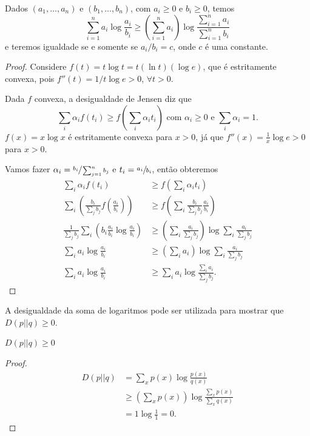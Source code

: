 \begin{proposition}
Dados $(a_1, \ldots, a_n)$ e $(b_1,\ldots,b_n)$, com $a_i \geq 0$ e $b_i \geq 0$, temos
\begin{equation}\label{eq:dessomalog}
\sum_{i=1}^n a_i \log \frac{a_i}{b_i} \geq \left( \sum_{i=1}^n a_i \right) \log \frac{\sum_{i=1}^n a_i}{\sum_{i=1}^n b_i}
\end{equation}
e teremos igualdade se e somente se $a_i/b_i = c$, onde $c$ é uma constante.
\end{proposition}
\begin{proof}
Considere $f(t) = t \log t = t (\ln t) (\log e)$, que é estritamente convexa, pois
$f''(t) = 1/t \log e >0$, $\forall t > 0$.

Dada $f$ convexa, a desigualdade de Jensen diz que
\begin{equation}
\sum_i \alpha_i f(t_i) \geq f \left( \sum_i \alpha_i t_i \right) \text{ com } \alpha_i \geq 0 \text{ e } \sum_i \alpha_i = 1.
\end{equation}
$f(x) = x \log x$ é estritamente convexa para $x>0$, já que $f''(x)=\frac{1}{x} \log e > 0$ para $x>0$.

Vamos fazer $\alpha_i = \sfrac{b_i}{\sum_{j=1}^n b_j}$ e $t_i = \sfrac{a_i}{b_i}$, então obteremos
\begin{subequations}
    \begin{align}
	\sum_i \alpha_i f(t_i) &\geq f \left( \sum_i \alpha_i t_i \right) \\
	\sum_i \left( \frac{b_i}{\sum_j b_j} f \left( \frac{a_i}{b_i} \right) \right) &\geq f \left( \sum_i \frac{b_i}{\sum_j b_j} \frac{a_i}{b_i} \right) \\
	\frac{1}{\sum_j b_j} \sum_i \left( b_i \frac{a_i}{b_i} \log \frac{a_i}{b_i} \right) &\geq \left( \sum_i \frac{a_i}{\sum_j b_j} \right) \log \sum_i \frac{a_i}{\sum_j b_j} \\
	\sum_i a_i \log \frac{a_i}{b_i} &\geq \left( \sum_i a_i \right) \log \sum_i \frac{a_i}{\sum_j b_j} \\
	\sum_i a_i \log \frac{a_i}{b_i} &\geq \sum_i a_i \log \frac{\sum_i a_i}{\sum_j b_j} .
    \end{align}
\end{subequations}
\end{proof}

A desigualdade da soma de logaritmos pode ser utilizada para mostrar que $D(p||q) \geq 0$.
\begin{proposition}
$D(p||q) \geq 0$
\end{proposition}
\begin{proof}
  \begin{subequations}
  \begin{align}
  D(p||q) &= \sum_x p(x) \log \frac{p(x)}{q(x)} \\
          &\geq \left( \sum_x p(x) \right) \log \frac{\sum_x p(x)}{\sum_x q(x)} \\
          &= 1 \log \frac{1}{1} = 0 .
  \end{align}
  \end{subequations}
\end{proof}


